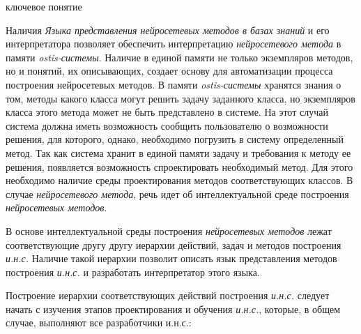\begin{SCn}
	\begin{scnrelfromlist}{ключевое понятие}
	\end{scnrelfromlist}
\end{SCn}

Наличия \textit{Языка представления нейросетевых методов в базах знаний} и его интерпретатора позволяет обеспечить интерпретацию \textit{нейросетевого метода} в памяти \textit{ostis-системы}. Наличие в единой памяти не только экземпляров методов, но и понятий, их описывающих, создает основу для автоматизации процесса построения нейросетевых методов. В памяти \textit{ostis-системы} хранятся знания о том, методы какого класса могут решить задачу заданного класса, но экземпляров класса этого метода может не быть представлено в системе. На этот случай система должна иметь возможность сообщить пользователю о возможности решения, для которого, однако, необходимо погрузить в систему определенный метод. Так как система хранит в единой памяти задачу и требования к методу ее решения, появляется возможность спроектировать необходимый метод. Для этого необходимо наличие среды проектирования методов соответствующих классов. В случае \textit{нейросетевого метода}, речь идет об интеллектуальной среде построения \textit{нейросетевых методов}.

В основе интеллектуальной среды построения \textit{нейросетевых методов} лежат соответствующие другу другу иерархии действий, задач и методов построения \textit{и.н.с.} Наличие такой иерархии позволит описать язык представления методов построения \textit{и.н.с.} и разработать интерпретатор этого языка.

Построение иерархии соответствующих действий построения \textit{и.н.с.} следует начать с изучения этапов проектирования и обучения \textit{и.н.с.}, которые, в общем случае, выполняют все разработчики и.н.с.:


